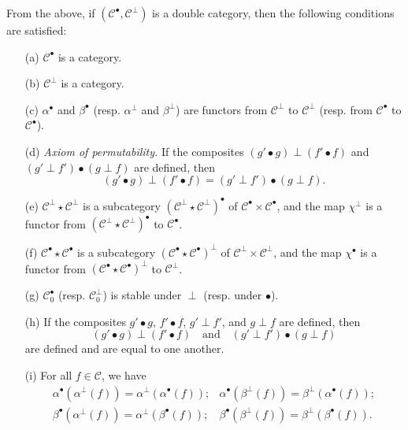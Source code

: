 \documentclass[a4paper,fleqn]{article}
\theoremstyle{plain}
\theoremstyle{definition}
\newcommand{\textand}{\quad\text{and}\quad}
\newcommand{\CC}{\mathcal{C}}
\begin{document}
From the above, if $(\CC^\bullet,\CC^\perp)$ is a double category, then the following conditions are satisfied:
\begin{enumerate}
  \item[\normalfont(a)]
    $\CC^\bullet$ is a category.
  \item[\normalfont(b)]
    $\CC^\perp$ is a category.
  \item[\normalfont(c)]
    $\alpha^\bullet$ and $\beta^\bullet$ (resp. $\alpha^\perp$ and $\beta^\perp$) are functors from $\CC^\perp$ to $\CC^\perp$ (resp. from $\CC^\bullet$ to $\CC^\bullet$).
  \item[\normalfont(d)]
    \emph{Axiom of permutability.}
    If the composites $(g'\bullet g)\perp(f'\bullet f)$ and $(g'\perp f')\bullet(g\perp f)$ are defined, then
    \[
      (g'\bullet g)\perp(f'\bullet f)
      = (g'\perp f')\bullet(g\perp f).
    \]
  \item[\normalfont(e)]
    $\CC^\perp\star\CC^\perp$ is a subcategory $(\CC^\perp\star\CC^\perp)^\bullet$ of $\CC^\bullet\times\CC^\bullet$, and the map $\chi^\perp$ is a functor from $(\CC^\perp\star\CC^\perp)^\bullet$ to $\CC^\bullet$.
  \item[\normalfont(f)]
    $\CC^\bullet\star\CC^\bullet$ is a subcategory $(\CC^\bullet\star\CC^\bullet)^\perp$ of $\CC^\perp\times\CC^\perp$, and the map $\chi^\bullet$ is a functor from $(\CC^\bullet\star\CC^\bullet)^\perp$ to $\CC^\perp$.
  \item[\normalfont(g)]
    $\CC_0^\bullet$ (resp. $\CC_0^\perp$) is stable under $\perp$ (resp. under $\bullet$).
  \item[\normalfont(h)]
    If the composites $g'\bullet g$, $f'\bullet f$, $g'\perp f'$, and $g\perp f$ are defined, then
    \[
      (g'\bullet g)\perp(f'\bullet f)
      \textand
      (g'\perp f')\bullet(g\perp f)
    \]
    are defined and are equal to one another.
  \item[\normalfont(i)]
    For all $f\in\CC$, we have
    \[
      \begin{array}{cc}
        \alpha^\bullet(\alpha^\perp(f))
        = \alpha^\perp(\alpha^\bullet(f));
        & \alpha^\bullet(\beta^\perp(f))
        = \beta^\perp(\alpha^\bullet(f));
      \\\beta^\bullet(\alpha^\perp(f))
        = \alpha^\perp(\beta^\bullet(f));
        & \beta^\bullet(\beta^\perp(f))
        = \beta^\perp(\beta^\bullet(f)).
      \end{array}
    \]
\end{enumerate}
\end{document}
